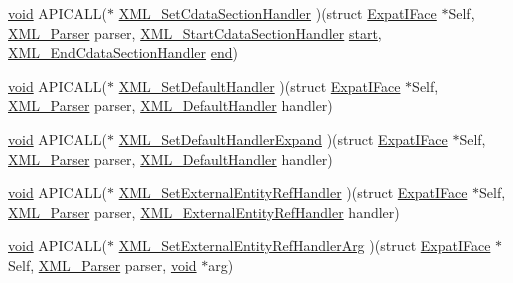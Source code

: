 \begin{DoxyCompactItemize}
\item 
\hyperlink{sound_8c_ae35f5844602719cf66324f4de2a658b3}{void} A\+P\+I\+C\+A\+LL($\ast$ \hyperlink{struct_expat_i_face_a33b500ca8dfac64f76d539a0621049d0}{X\+M\+L\+\_\+\+Set\+Cdata\+Section\+Handler} )(struct \hyperlink{struct_expat_i_face}{Expat\+I\+Face} $\ast$Self, \hyperlink{amiga_2include_2libraries_2expat_8h_a9dc0003156857c67b3a60b3993846013}{X\+M\+L\+\_\+\+Parser} parser, \hyperlink{amiga_2include_2libraries_2expat_8h_a68a18e698f04c0cfedac814093d01a43}{X\+M\+L\+\_\+\+Start\+Cdata\+Section\+Handler} \hyperlink{seqread_8c_ac503262ae470564980711da4f78b1181}{start}, \hyperlink{amiga_2include_2libraries_2expat_8h_a52f3541344fd2e255bbd06f6b08321e2}{X\+M\+L\+\_\+\+End\+Cdata\+Section\+Handler} \hyperlink{convtest_8m_afb358f48b1646c750fb9da6c6585be2b}{end})
\item 
\hyperlink{sound_8c_ae35f5844602719cf66324f4de2a658b3}{void} A\+P\+I\+C\+A\+LL($\ast$ \hyperlink{struct_expat_i_face_a3b984df3014894999017b7739af71472}{X\+M\+L\+\_\+\+Set\+Default\+Handler} )(struct \hyperlink{struct_expat_i_face}{Expat\+I\+Face} $\ast$Self, \hyperlink{amiga_2include_2libraries_2expat_8h_a9dc0003156857c67b3a60b3993846013}{X\+M\+L\+\_\+\+Parser} parser, \hyperlink{amiga_2include_2libraries_2expat_8h_adbfd4da0da32dc94f3f99d1504ff579e}{X\+M\+L\+\_\+\+Default\+Handler} handler)
\item 
\hyperlink{sound_8c_ae35f5844602719cf66324f4de2a658b3}{void} A\+P\+I\+C\+A\+LL($\ast$ \hyperlink{struct_expat_i_face_a1c5dd415b219e25d57787b14f8d00213}{X\+M\+L\+\_\+\+Set\+Default\+Handler\+Expand} )(struct \hyperlink{struct_expat_i_face}{Expat\+I\+Face} $\ast$Self, \hyperlink{amiga_2include_2libraries_2expat_8h_a9dc0003156857c67b3a60b3993846013}{X\+M\+L\+\_\+\+Parser} parser, \hyperlink{amiga_2include_2libraries_2expat_8h_adbfd4da0da32dc94f3f99d1504ff579e}{X\+M\+L\+\_\+\+Default\+Handler} handler)
\item 
\hyperlink{sound_8c_ae35f5844602719cf66324f4de2a658b3}{void} A\+P\+I\+C\+A\+LL($\ast$ \hyperlink{struct_expat_i_face_af460be603cc484ad1c5b3aeb3065d5a6}{X\+M\+L\+\_\+\+Set\+External\+Entity\+Ref\+Handler} )(struct \hyperlink{struct_expat_i_face}{Expat\+I\+Face} $\ast$Self, \hyperlink{amiga_2include_2libraries_2expat_8h_a9dc0003156857c67b3a60b3993846013}{X\+M\+L\+\_\+\+Parser} parser, \hyperlink{amiga_2include_2libraries_2expat_8h_ac8ff16e5cabd8d1c5543bc091ded0498}{X\+M\+L\+\_\+\+External\+Entity\+Ref\+Handler} handler)
\item 
\hyperlink{sound_8c_ae35f5844602719cf66324f4de2a658b3}{void} A\+P\+I\+C\+A\+LL($\ast$ \hyperlink{struct_expat_i_face_a6f0565b8c879c72001f1b5acfb745613}{X\+M\+L\+\_\+\+Set\+External\+Entity\+Ref\+Handler\+Arg} )(struct \hyperlink{struct_expat_i_face}{Expat\+I\+Face} $\ast$Self, \hyperlink{amiga_2include_2libraries_2expat_8h_a9dc0003156857c67b3a60b3993846013}{X\+M\+L\+\_\+\+Parser} parser, \hyperlink{sound_8c_ae35f5844602719cf66324f4de2a658b3}{void} $\ast$arg)

\end{DoxyCompactItemize}

